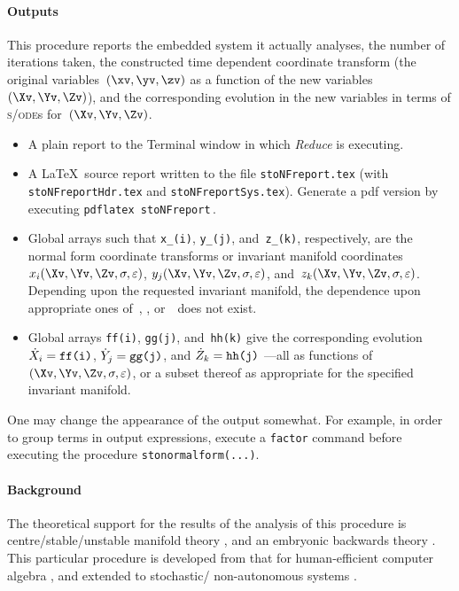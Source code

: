 \documentclass[11pt,a5paper]{article}
\def\eps{\ensuremath{\varepsilon}}
\def\sde{\textsc{s/ode}}
\begin{document}
\paragraph{Outputs}  This procedure reports the embedded
system it actually analyses, the number of iterations taken,
the constructed time dependent coordinate transform (the
original variables~\((\xv,\yv,\zv)\) as a function of the
new variables~\((\Xv,\Yv,\Zv)\)), and the corresponding
evolution in the new variables in terms of \sde{}s
for~\((\Xv,\Yv,\Zv)\).
\begin{itemize}
\item A plain report to the Terminal window in which
\emph{Reduce} is executing.

\item A \LaTeX\ source report written to the file
\verb|stoNFreport.tex| (with \verb|stoNFreportHdr.tex|
and \verb|stoNFreportSys.tex|). Generate a pdf version 
by executing \verb|pdflatex stoNFreport|\,.

\item Global arrays such that \verb|x_(i)|, \verb|y_(j)|,
and~\verb|z_(k)|, respectively, are the normal form
coordinate transforms or invariant manifold coordinates
\(x_i(\Xv,\Yv,\Zv,\sigma,\eps)\),
\(y_j(\Xv,\Yv,\Zv,\sigma,\eps)\),
and~\(z_k(\Xv,\Yv,\Zv,\sigma,\eps)\). Depending upon the
requested invariant manifold, the dependence upon
appropriate ones of~\Xv, \Yv, or~\Zv\ does not exist.

\item Global arrays \verb|ff(i)|, \verb|gg(j)|,
and~\verb|hh(k)| give the corresponding evolution \(\dot
X_i=\verb|ff(i)|\), \(\dot Y_j=\verb|gg(j)|\), and \(\dot
Z_k=\verb|hh(j)|\) ---all as functions
of~\((\Xv,\Yv,\Zv,\sigma,\eps)\), or a subset thereof as
appropriate for the specified invariant manifold.
\end{itemize}
One may change the appearance of the output somewhat. For
example, in order to group terms in output expressions,
execute a \verb|factor| command before executing the
procedure \verb|stonormalform(...)|.


\paragraph{Background}
The theoretical support for the results of the analysis of
this procedure is centre\slash stable\slash unstable
manifold theory \cite[e.g.,][]{Carr81, Knobloch82,
Haragus2011, Roberts2014a}, and an embryonic backwards
theory \cite[]{Roberts2018a}.  This particular procedure is
developed from that for human-efficient computer algebra
\cite[]{Roberts96a}, and extended to stochastic\slash
non-autonomous systems \cite[]{Chao95, Roberts06k}.
\end{document}

